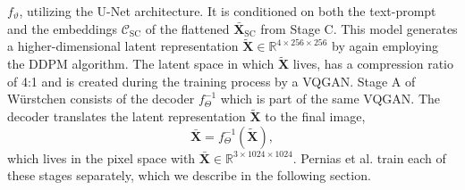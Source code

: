 $f_\vartheta$, utilizing the U-Net architecture. It is conditioned on both the
text-prompt and the embeddings $\mathcal{C}_{\text{SC}}$ of the flattened
$\bar{\boldsymbol{X}}_{\text{SC}}$ from Stage C. This model generates a
higher-dimensional latent representation
$\tilde{\boldsymbol{X}}\in\mathbb{R}^{4\times256\times256}$ by again employing
the DDPM algorithm. The latent space in which $\tilde{\boldsymbol{X}}$ lives,
has a compression ratio of 4:1 and is created during the training process by a
VQGAN. Stage A of W\"urstchen consists of the decoder $f_\Theta^{-1}$ which is
part of the same  VQGAN. The decoder translates the latent representation
$\tilde{\boldsymbol{X}}$ to the final image,
\begin{equation}
    \bar{\boldsymbol{X}} = f_\Theta^{-1}(\tilde{\boldsymbol{X}}),
\end{equation}
which lives in the pixel space with $\bar{\boldsymbol{X}}\in\mathbb{R}^{3\times1024\times1024}$.
Pernias et al. train each of these stages separately, which we describe in the
following section.
